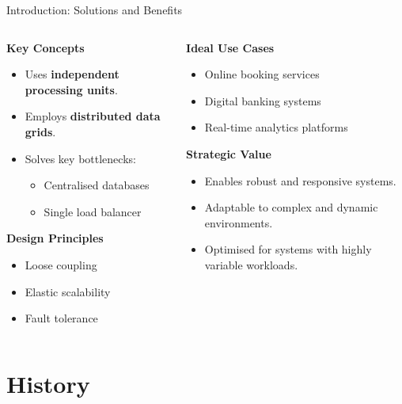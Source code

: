 \documentclass[aspectratio=169, table]{beamer}
\begin{document}
	\begin{frame}{Introduction: Solutions and Benefits}
		\vspace{20pt}
		\begin{columns}[t]
			\begin{column}{0.5\textwidth}
				\textbf{Key Concepts}
				\begin{itemize}
					\item Uses \textbf{independent processing units}.
					\item Employs \textbf{distributed data grids}.
					\item Solves key bottlenecks:
					\begin{itemize}
						\item Centralised databases
						\item Single load balancer
					\end{itemize}
				\end{itemize}
				
				\textbf{Design Principles}
				\begin{itemize}
					\item Loose coupling
					\item Elastic scalability
					\item Fault tolerance
				\end{itemize}
			\end{column}
			
			\begin{column}{0.5\textwidth}
				\textbf{Ideal Use Cases}
				\begin{itemize}
					\item Online booking services
					\item Digital banking systems
					\item Real-time analytics platforms
				\end{itemize}
				
				\textbf{Strategic Value}
				\begin{itemize}
					\item Enables robust and responsive systems.
					\item Adaptable to complex and dynamic environments.
					\item Optimised for systems with highly variable workloads.
				\end{itemize}
			\end{column}
		\end{columns}
	\end{frame}
	
	\section{History}
	
\end{document}
